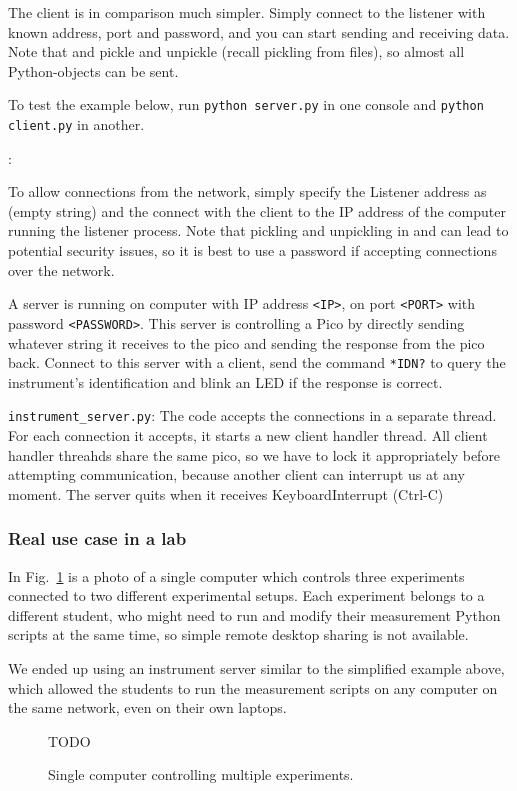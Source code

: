 The client is in comparison much simpler. Simply connect to the listener with known address, port and password, and you can start sending and receiving data. Note that  and  pickle and unpickle (recall pickling from  files), so almost all Python-objects can be sent.

To test the example below, run \verb|python server.py| in one console and \verb|python client.py| in another.

:




To allow connections from the network, simply specify the Listener address as  (empty string) and the connect with the client to the IP address of the computer running the listener process. Note that pickling and unpickling in  and  can lead to potential security issues, so it is best to use a password if accepting connections over the network.

\begin{exercise}
A server is running on computer with IP address \verb|<IP>|, on port \verb|<PORT>| with password \verb|<PASSWORD>|. This server is controlling a Pico by directly sending whatever string it receives to the pico and sending the response from the pico back. Connect to this server with a client, send the command \verb|*IDN?| to query the instrument's identification and blink an LED if the response is correct.
\end{exercise}

\verb|instrument_server.py|:
The code accepts the connections in a separate thread. For each connection it accepts, it starts a new client handler thread. All client handler threahds share the same pico, so we have to lock it appropriately before attempting communication, because another client can interrupt us at any moment. The server quits when it receives KeyboardInterrupt (Ctrl-C) 


\subsubsection{Real use case in a lab}
In Fig.~\ref{fig:networking-usecase} is a photo of a single computer which controls three experiments connected to two different experimental setups. Each experiment belongs to a different student, who might need to run and modify their measurement Python scripts at the same time, so simple remote desktop sharing is not available.

We ended up using an instrument server similar to the simplified example above, which allowed the students to run the measurement scripts on any computer on the same network, even on their own laptops.

\begin{figure}
    \label{fig:networking-usecase}
    TODO
    \caption{Single computer controlling multiple experiments.}
\end{figure}